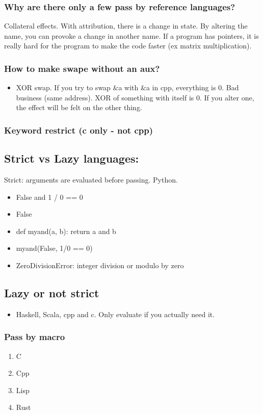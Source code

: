\documentclass[11pt]{article}
\begin{document}
\subsubsection{Why are there only a few pass by reference languages?}
\label{sec:org9de9d91}
Collateral effects. With attribution, there is a change in state. By altering the
name, you can provoke a change in another name. If a program has pointers, it is
really hard for the program to make the code faster (ex matrix multiplication).
\subsubsection{How to make swape without an aux?}
\label{sec:orgb8f6eb5}
\begin{itemize}
\item XOR swap. If you try to swap \&a with \&a in cpp, everything is 0. Bad business (same
address). XOR of something with itself is 0. If you alter one, the effect will be
felt on the other thing.
\end{itemize}
\subsubsection{Keyword restrict (c only - not cpp)}
\label{sec:org2ece700}
\subsection{Strict vs Lazy languages:}
\label{sec:orgd54067a}
Strict: arguments are evaluated before passing. Python.
\begin{itemize}
\item False and 1 / 0 == 0
\item False

\item def myand(a, b): return a and b
\item myand(False, 1/0 == 0)
\item ZeroDivisionError: integer division or modulo by zero
\end{itemize}
\subsection{Lazy or not strict}
\label{sec:org8ad079a}
\begin{itemize}
\item Haskell, Scala, cpp and c. Only evaluate if you actually need it.
\end{itemize}
\subsubsection{Pass by macro}
\label{sec:org7d2b32e}
\begin{enumerate}
\item C

\item Cpp

\item Lisp

\item Rust
\end{enumerate}
\end{document}
